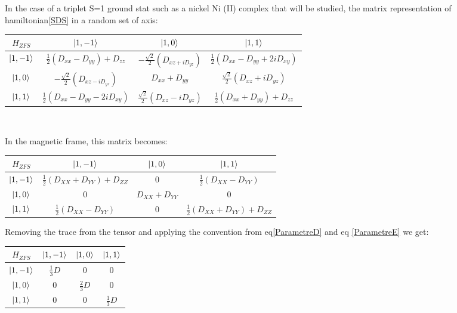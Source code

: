\documentclass{article}
\begin{document}
In the case of a triplet S=1 ground stat such as a nickel Ni (II) complex that will be studied, the matrix representation of hamiltonian\ref{SDS} in a random set of axis:
\begin{center}
\begin{tabular}{ c | c c c}
    $H_{ZFS}$ & $\ket{1,-1}$ & $\ket{1,0} $& $\ket{1,1}$ \\
    \hline
    $\ket{1,-1} $&  $\frac{1}{2}(D_{xx}-D_{yy})+D_{zz}$ & $-\frac{\sqrt{2}}{2}(D_{xz+iD_{yz}}) $ & $\frac{1}{2}(D_{xx}-D_{yy}+2iD_{xy})$ \\
    $\ket{1,0}$ & $-\frac{\sqrt{2}}{2}(D_{xz-iD_{yz}})  $& $ D_{xx}+D_{yy}  $&$ \frac{\sqrt{2}}{2}(D_{xz}+iD_{yz})$ \\
    $\ket{1,1} $& $ \frac{1}{2}(D_{xx}-D_{yy}-2iD_{xy}) $& $\frac{\sqrt{2}}{2}(D_{xz}-iD_{yz})$  & $\frac{1}{2}(D_{xx}+D_{yy})+D_{zz} $ \\
\end{tabular}\\
\end{center}
In the magnetic frame, this matrix becomes:
\begin{center}
\begin{tabular}{c | c c c}
    $H_{ZFS}$ & $\ket{1,-1}$ & $\ket{1,0} $& $\ket{1,1}$ \\
    \hline
    $\ket{1,-1}$ & $\frac{1}{2}(D_{XX}+D_{YY})+D_{ZZ}$ & 0 & $\frac{1}{2}(D_{XX}-D_{YY})$\\
    $\ket{1,0}$ & 0 & $D_{XX}+D_{YY}$ & 0\\
    $\ket{1,1}$ &  $\frac{1}{2}(D_{XX}-D_{YY})$ & 0 & $\frac{1}{2}(D_{XX}+D_{YY})+D_{ZZ}$
\end{tabular}
\end{center}
Removing the trace from the tensor and applying the convention from eq\ref{ParametreD} and eq \ref{ParametreE} we get:
\begin{center}
\begin{tabular}{c | c c c}
    $H_{ZFS}$ & $\ket{1,-1}$ & $\ket{1,0}$ & $\ket{1,1}$\\
    \hline
    $\ket{1,-1}$ & $\frac{1}{3}D$ & 0 & 0\\
    $\ket{1,0}$ & 0 & $\frac{2}{3}D $& 0\\
    $\ket{1,1}$ & 0 & 0 & $\frac{1}{3}D$
\end{tabular}
\end{center}
\end{document}
